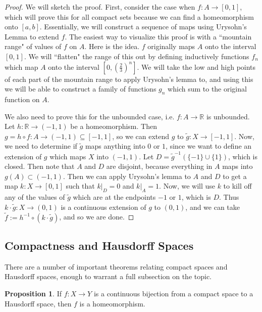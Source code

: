 \documentclass[11pt, oneside]{amsart}   	%
\theoremstyle{definition}
\newtheorem{prop}{Proposition}[section]
\begin{document}
	\begin{proof}
		We will sketch the proof. First, consider the case when $f : A\rightarrow [0, 1]$, which will prove this for all 
		compact sets because we can find a homeomorphism onto $[a, b]$. Essentially, we will construct a sequence 
		of maps using Urysohn's Lemma to extend $f$. The easiest way to visualize this proof is with a ``mountain 
		range" of values of $f$ on $A$. Here is the idea. $f$ originally maps $A$ onto the interval $[0, 1]$. We will 
		``flatten" the range of this out by defining inductively functions $f_n$ which map $A$ onto the interval $[0, 
		(\frac{2}{3})^n]$. We will take the low and high points of each part of the mountain range to apply Urysohn's 
		lemma to, and using this we will be able to construct a family of functions $g_n$ which sum to the original 
		function on $A$.
		
		We also need to prove this for the unbounded case, i.e. $f : A\rightarrow\mathbb R$ is unbounded. Let 
		$h : \mathbb R\rightarrow (-1, 1)$ be a homeomorphism. Then $g = h\circ f : A\rightarrow (-1, 1)\subseteq [-1, 1]$, 
		so we can extend $g$ to $\tilde g : X\rightarrow [-1, 1]$. Now, we need to determine if $\tilde g$ maps anything 
		into $0$ or $1$, since we want to define an extension of $g$ which maps $X$ into $(-1, 1)$. Let $D = 
		\tilde g^{-1}(\{-1\}\cup\{1\})$, which is closed. Then note that $A$ and $D$ are disjoint, because everything in 
		$A$ maps into $g(A)\subset (-1, 1)$. Then we can apply Urysohn's lemma to $A$ and $D$ to get a map 
		$k : X\rightarrow [0, 1]$ such that $k|_D = 0$ and $k|_A = 1$. Now, we will use $k$ to kill off any of the values 
		of $\tilde g$ which are at the endpoints $-1$ or $1$, which is $D$. Thus $k\cdot\tilde g : X\rightarrow (0, 1)$ is a 
		continuous extension of $g$ to $(0, 1)$, and we can take $\tilde f := h^{-1}\circ (k\cdot\tilde g)$, and so we are done.
	\end{proof}
	
	\subsection{Compactness and Hausdorff Spaces}
	
	There are a number of important theorems relating compact spaces and Hausdorff spaces, enough to warrant a full 
	subsection on the topic. 
	
	\begin{prop}
		If $f : X\rightarrow Y$ is a continuous bijection from a compact space to a Hausdorff space, then $f$ is a 
		homeomorphism. 
	\end{prop}
	
\end{document}
